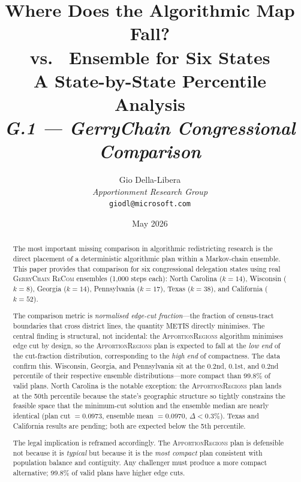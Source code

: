 \documentclass[12pt]{article}
\title{%
  \textbf{Where Does the Algorithmic Map Fall?}\\
  \textbf{\ar{} vs.\ \gc{} Ensemble for Six States}\\[0.4em]
  \large A State-by-State Percentile Analysis\\[0.8em]
  \normalsize\textit{G.1 --- GerryChain Congressional Comparison}%
}
\author{%
  Gio Della-Libera\\
  \textit{Apportionment Research Group}\\
  \small\texttt{giodl@microsoft.com}
}
\date{May 2026}
\newcommand{\ar}{\textsc{ApportionRegions}}
\newcommand{\gc}{\textsc{GerryChain}}
\newcommand{\recom}{\textsc{ReCom}}
\begin{document}
\maketitle

\begin{abstract}
\noindent
The most important missing comparison in algorithmic redistricting research
is the direct placement of a deterministic algorithmic plan within a
Markov-chain ensemble.  This paper provides that comparison for six
congressional delegation states using real \gc{} \recom{} ensembles (1,000
steps each): North Carolina ($k=14$), Wisconsin ($k=8$), Georgia ($k=14$),
Pennsylvania ($k=17$), Texas ($k=38$), and California ($k=52$).

The comparison metric is \emph{normalised edge-cut fraction}---the fraction
of census-tract boundaries that cross district lines, the quantity METIS
directly minimises.  The central finding is structural, not incidental: the
\ar{} algorithm minimises edge cut by design, so the \ar{} plan is expected
to fall at the \emph{low end} of the cut-fraction distribution, corresponding
to the \emph{high end} of compactness.  The data confirm this.  Wisconsin,
Georgia, and Pennsylvania sit at the 0.2nd, 0.1st, and 0.2nd percentile of
their respective ensemble distributions---more compact than 99.8\% of valid
plans.  North Carolina is the notable exception: the \ar{} plan lands at the
50th percentile because the state's geographic structure so tightly constrains
the feasible space that the minimum-cut solution and the ensemble median are
nearly identical (plan cut $= 0.0973$, ensemble mean $= 0.0970$, $\Delta <
0.3\%$).  Texas and California results are pending; both are expected below
the 5th percentile.

The legal implication is reframed accordingly.  The \ar{} plan is defensible
not because it is \emph{typical} but because it is the \emph{most compact}
plan consistent with population balance and contiguity.  Any challenger must
produce a more compact alternative; 99.8\% of valid plans have higher edge cuts.
\end{abstract}

\tableofcontents
\newpage













\end{document}
